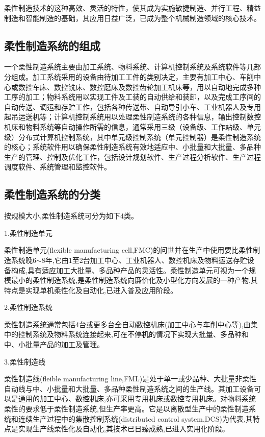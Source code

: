 \documentclass[UTF8]{ctexbook}
\newcommand{\◎}{\ensuremath{\bigcirc}}
\begin{document}
柔性制造技术的这种高效、灵活的特性，使其成为实施敏捷制造、并行工程、精益制造和智能制造的基础，其应用日益广泛，已成为整个机械制造领域的核心技术。

\subsection{柔性制造系统的组成}

一个柔性制造系统主要由加工系统、物料系统、计算机控制系统及系统软件等几部分组成。加工系统采用的设备由待加工工件的类别决定，主要有加工中心、车削中心或数控车床、数控铣床、数控磨床及数控齿轮加工机床等，用以自动地完成多种工序的加工；物料系统用以实现工件及工装的自动供给和装卸，以及完成工序间的自动传送、调运和存贮工作，包括各种传送带、自动导引小车、工业机器人及专用起吊运送机等；计算机控制系统用以处理柔性制造系统的各种信息，输出控制数控机床和物料系统等自动操作所需的信息，通常采用三级（设备级、工作站级、单元级）分布式计算机控制系统，其中单元级控制系统（单元控制器）是柔性制造系统的核心；系统软件用以确保柔性制造系统有效地适应中、小批量和大批量、多品种生产的管理、控制及优化工作，包括设计规划软件、生产过程分析软件、生产过程调度软件、系统管理和监控软件。

\subsection{柔性制造系统的分类}
按规模大小,柔性制造系统可分为如下4类。

1.柔性制造单元
    
    柔性制造单元(flexible manufacturing cell,FMC)的问世并在生产中使用要比柔性制造系统晚6$\sim$8年,它由1至2台加工中心、工业机器人、数控机床及物料运送存贮设备构成,具有适应加工大批量、多品种产品的灵活性。柔性制造单元可视为一个规模最小的柔性制造系统,是柔性制造系统向廉价化及小型化方向发展的一种产物,其特点是实现单机柔性化及自动化,已进入普及应用阶段。
    
2.柔性制造系统
    
    柔性制造系统通常包括4台或更多台全自动数控机床(加工中心与车削中心等),由集中的控制系统及物料系统连接起来,可在不停机的情况下实现大批量、多品种和中、小批量产品的加工及管理。
    
3.柔性制造线
    
    柔性制造线(fleible manufacturing line,FML)是处于单一或少品种、大批量非柔性自动线与中、小批量和大批量、多品种柔性制造系统之间的生产线。其加工设备可以是通用的加工中心、数控机床,亦可采用专用机床或数控专用机床。对物料系统柔性的要求低于柔性制造系统,但生产率更高。它是以离散型生产中的柔性制造系统和连续生产过程中的集散控制系统(distributed control system,DCS)为代表,其特点是实现生产线柔性化及自动化,其技术已日臻成熟,已进入实用化阶段。
    
\end{document}
